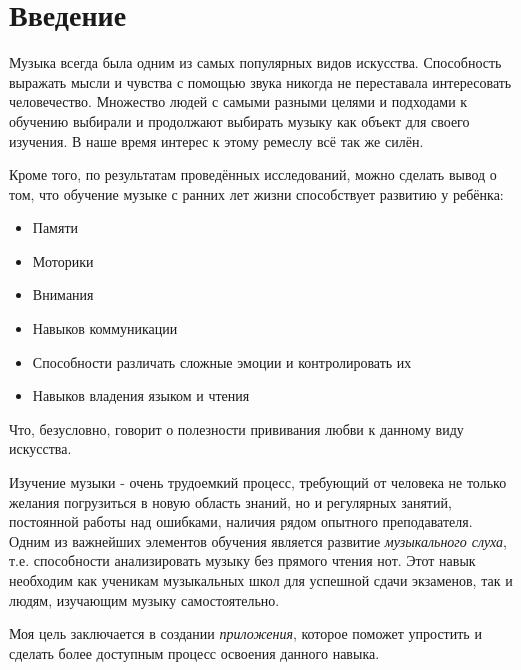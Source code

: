 \chapter{Введение}
\setlength\parindent{1.5em} 
\par 
Музыка всегда была одним из самых популярных видов искусства. Способность выражать мысли и чувства с помощью звука никогда не переставала интересовать человечество. Множество людей с самыми разными целями и подходами к обучению выбирали и продолжают выбирать музыку как объект для своего изучения. В наше время интерес к этому ремеслу всё так же силён\cite{thamprasert2023network}.

Кроме того, по результатам проведённых исследований\cite{dumont2017music}, можно сделать вывод о том, что обучение музыке с ранних лет жизни способствует развитию у ребёнка:
\begin{itemize}
\item Памяти
\item Моторики
\item Внимания
\item Навыков коммуникации
\item Способности различать сложные эмоции и контролировать их
\item Навыков владения языком и чтения
\end{itemize}\par
Что, безусловно, говорит о полезности прививания любви к данному виду искусства.\par

Изучение музыки - очень трудоемкий процесс, требующий от человека не только желания погрузиться в новую область знаний, но и регулярных занятий, постоянной работы над ошибками, наличия рядом опытного преподавателя. Одним из важнейших элементов обучения является развитие \textit{музыкального слуха}, т.е. способности анализировать музыку без прямого чтения нот. Этот навык необходим как ученикам музыкальных школ для успешной сдачи экзаменов, так и людям, изучающим музыку самостоятельно.\par

Моя цель заключается в создании \textit{приложения}, которое поможет упростить и сделать более доступным процесс освоения данного навыка.